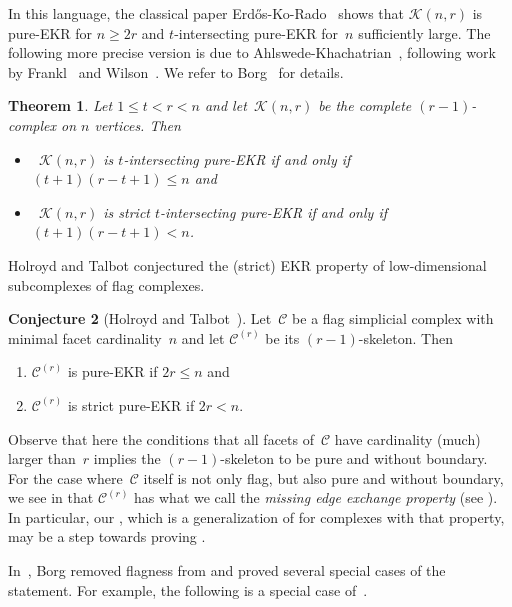 \documentclass[a4paper,12pt]{amsart}
\theoremstyle{plain}
\newtheorem{theorem}{Theorem}[section]
\theoremstyle{definition}
\newtheorem{conjecture}[theorem]{Conjecture}
\newcommand{\darkred}{\color{darkred}} %
\newcommand{\C}{\mathcal C}
\newcommand{\K}{\mathcal K}
\newcommand{\defn}[1]{\emph{\darkred #1}} %
\begin{document}
In this language, the classical paper Erd\H{o}s-Ko-Rado~\cite{EKR1961} shows that $\K(n,r)$ is pure-EKR for $n \geq 2r$ and $t$-intersecting pure-EKR for~$n$ sufficiently large.
The following more precise version is due to Ahlswede-Khachatrian~\cite{AK1997}, following work by Frankl~\cite{Fra1978} and Wilson~\cite{Wil1984}.
We refer to Borg~\cite[Theorem~1.3]{Bor2009} for details.

\begin{theorem}
\label{thm:EKR2}
  Let $1 \leq t < r < n$ and let~$\K(n,r) $ be the complete $(r-1)$-complex on $n$ vertices. Then
  \begin{itemize}
    \item~$\K(n,r) $ is $t$-intersecting pure-EKR if and only if $(t+1)(r-t+1) \leq n$ and
    \item~$\K(n,r) $ is strict $t$-intersecting pure-EKR if and only if $(t+1)(r-t+1) < n$.
  \end{itemize}
\end{theorem}

Holroyd and Talbot conjectured the (strict) EKR property of low-dimensional subcomplexes of flag complexes.

\begin{conjecture}[Holroyd and Talbot~\cite{HT2005}]
\label{conj:HT}
  Let~$\C$ be a flag simplicial complex with minimal facet cardinality~$n$ and let $\C^{(r)}$ be its $(r-1)$-skeleton.
  Then
  \begin{enumerate}[(1)]
    \item $\C^{(r)}$ is pure-EKR if $2r \leq n$ and \label{eq:conj:HT1}
    \item $\C^{(r)}$ is strict pure-EKR if $2r < n$.
  \end{enumerate}
\end{conjecture}

Observe that here the conditions that all facets of~$\C$ have cardinality (much) larger than~$r$ implies the $(r-1)$-skeleton to be pure and without boundary.
For the case where~$\C$ itself is not only flag, but also pure and without boundary, we see in  that $\C^{(r)}$ has what we call the \defn{missing edge exchange property} (see ).
In particular, our , which is a generalization of  for complexes with that property, may be a step towards proving .

In~\cite{Bor2009}, Borg removed flagness from  and proved several special cases of the statement. For example, the following is a special case of~\cite[Theorem~2.1]{Bor2009}.
\end{document}
